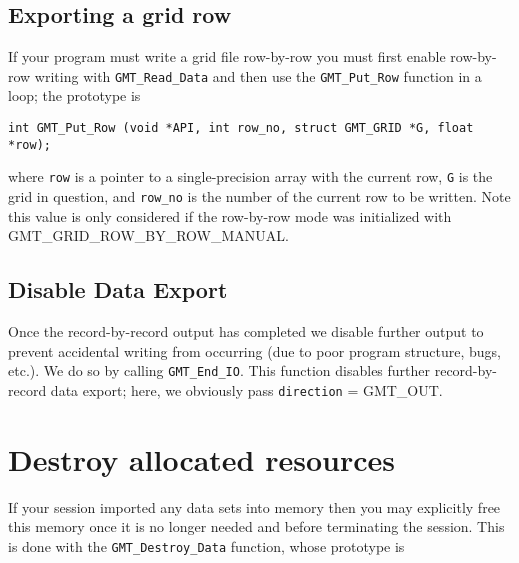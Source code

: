 \documentclass[11pt]{report}
\begin{document}
\subsection{Exporting a grid row}

If your program must write a grid file row-by-row you must first enable row-by-row
writing with \texttt{GMT\_Read\_Data} and then use the \texttt{GMT\_Put\_Row} function in a loop;
the prototype is

\begin{verbatim}
int GMT_Put_Row (void *API, int row_no, struct GMT_GRID *G, float *row);
\end{verbatim}
where \texttt{row} is a pointer to a single-precision array with the current row,
\texttt{G} is the grid in question, and \texttt{row\_no} is the number of the current
row to be written.  Note this value is only considered if the row-by-row mode was
initialized with GMT\_GRID\_ROW\_BY\_ROW\_MANUAL.

\subsection{Disable Data Export}

Once the record-by-record output has completed we disable further output to prevent accidental
writing from occurring (due to poor program structure, bugs, etc.).  We do so by calling \texttt{GMT\_End\_IO}.  This
function disables further record-by-record data export; here, we obviously pass \texttt{direction} = GMT\_OUT.

\section{Destroy allocated resources}

If your session imported any data sets into memory then you may explicitly free this
memory once it is no longer needed and before terminating the session.
This is done with the \texttt{GMT\_Destroy\_Data} function, whose prototype is
\end{document}
